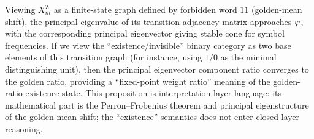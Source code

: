 \begin{remark}
Viewing $X_m^{\mathrm Z}$ as a finite-state graph defined by forbidden word $11$ (golden-mean shift), the principal eigenvalue of its transition adjacency matrix approaches $\varphi$, with the corresponding principal eigenvector giving stable cone for symbol frequencies. If we view the ``existence/invisible'' binary category as two base elements of this transition graph (for instance, using $1/0$ as the minimal distinguishing unit), then the principal eigenvector component ratio converges to the golden ratio, providing a ``fixed-point weight ratio'' meaning of the golden-ratio existence state. This proposition is interpretation-layer language: its mathematical part is the Perron--Frobenius theorem and principal eigenstructure of the golden-mean shift; the ``existence'' semantics does not enter closed-layer reasoning.
\end{remark}
